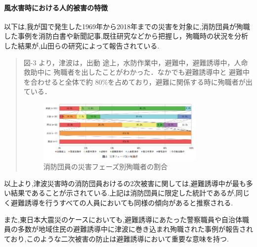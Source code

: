 \paragraph{風水害時における人的被害の特徴}
以下は,我が国で発生した1969年から2018年までの災害を対象に,消防団員が殉職した事例を消防白書や新聞記事,既往研究などから把握し，殉職時の状況を分析した結果が,山田らの研究\cite{yamada2020}によって報告されている.
\begin{quote}
  図-3 より，津波は，出動 途上，水防作業中，避難中，避難誘導中，人命救助中に 殉職者を出したことがわかった．なかでも避難誘導中と 避難中を合わせると全体で約 80\%を占めており，避難に関係する時に殉職者が出ている．
  \begin{figure}[H] 
    \centering 
    \includegraphics[width=0.8\textwidth]{Figures/fig-01.png}
    \caption{消防団員の災害フェーズ別殉職者の割合} 
    \label{fig:01} 
  \end{figure}
\end{quote}
以上より,津波災害時の消防団員おけるの2次被害に関しては,避難誘導中が最も多い結果であることが示されている.上記は消防団員に限定した統計であるが,同じく避難誘導を行うすべての人員においても同様の傾向があると推察される.\par
また,東日本大震災のケースにおいても,避難誘導にあたった警察職員や自治体職員の多数が地域住民の避難誘導中に津波に巻き込まれ殉職された事例\cite{touhoku-01}が報告されており,このような二次被害の防止は避難誘導において重要な意味を持つ.

